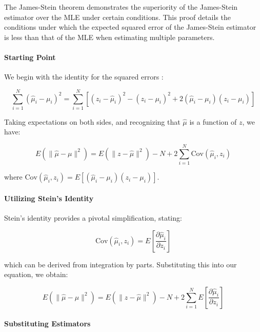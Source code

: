 The James-Stein theorem demonstrates the superiority of the James-Stein estimator over the MLE under certain conditions. This proof details the conditions under which the expected squared error of the James-Stein estimator is less than that of the MLE when estimating multiple parameters.

\paragraph{Starting Point}

We begin with the identity for the squared errors \cite{efron2012large}:

\begin{equation}
    \sum_{i=1}^{N}{(\hat\mu_i-\mu_i)^2} = \sum_{i=1}^{N}{[(z_i-\hat\mu_i)^2-(z_i-\mu_i)^2+2(\hat\mu_i-\mu_i)(z_i-\mu_i)]}
\end{equation}

Taking expectations on both sides, and recognizing that \(\hat\mu\) is a function of \(z\), we have:

\begin{equation}
    E(\|\hat\mu-\mu\|^2) = E(\|z - \hat\mu\|^2) - N + 2\sum_{i=1}^{N}{\text{Cov}(\hat\mu_i,z_i)}
\end{equation}

where \(\text{Cov}(\hat\mu_i,z_i) = E[(\hat\mu_i-\mu_i)(z_i-\mu_i)]\).

\paragraph{Utilizing Stein's Identity}

Stein's identity provides a pivotal simplification, stating:

\begin{equation}
    \text{Cov}(\hat\mu_i,z_i) = E\left[\frac{\partial{\hat\mu_i}}{\partial{z_i}}\right]
\end{equation}

which can be derived from integration by parts. Substituting this into our equation, we obtain:

\begin{equation}
    E(\|\hat\mu-\mu\|^2) = E(\|z - \hat\mu\|^2) - N + 2\sum_{i=1}^{N}{E\left[\frac{\partial{\hat\mu_i}}{\partial{z_i}}\right]}
\end{equation}

\paragraph{Substituting Estimators}

